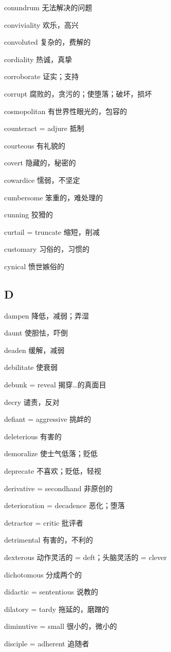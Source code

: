 \documentclass[UTF8, fontset = none, zihao = -4, linespread = 1.1]{ctexart}
\begin{document}
\begin{multicols}{2}
conundrum 无法解决的问题

conviviality 欢乐，高兴

convoluted 复杂的，费解的

cordiality 热诚，真挚

corroborate 证实；支持

corrupt 腐败的，贪污的；使堕落；破坏，损坏

cosmopolitan 有世界性眼光的，包容的

counteract = adjure 抵制

courteous 有礼貌的

covert 隐藏的，秘密的

cowardice 懦弱，不坚定

cumbersome 笨重的，难处理的

cunning 狡猾的

curtail = truncate 缩短，削减

customary 习俗的，习惯的

cynical 愤世嫉俗的

\subsection*{D}
dampen 降低，减弱；弄湿

daunt 使胆怯，吓倒

deaden 缓解，减弱

debilitate 使衰弱

debunk = reveal 揭穿…的真面目

decry 谴责，反对

defiant = aggressive 挑衅的

deleterious 有害的

demoralize 使士气低落；贬低

deprecate 不喜欢；贬低，轻视

derivative = secondhand 非原创的

deterioration = decadence 恶化；堕落

detractor = critic 批评者

detrimental 有害的，不利的

dexterous 动作灵活的 = deft；头脑灵活的 = clever

dichotomous 分成两个的

didactic = sententious 说教的

dilatory = tardy 拖延的，磨蹭的

diminutive = small 很小的，微小的

disciple = adherent 追随者


\end{multicols}
\end{document}
